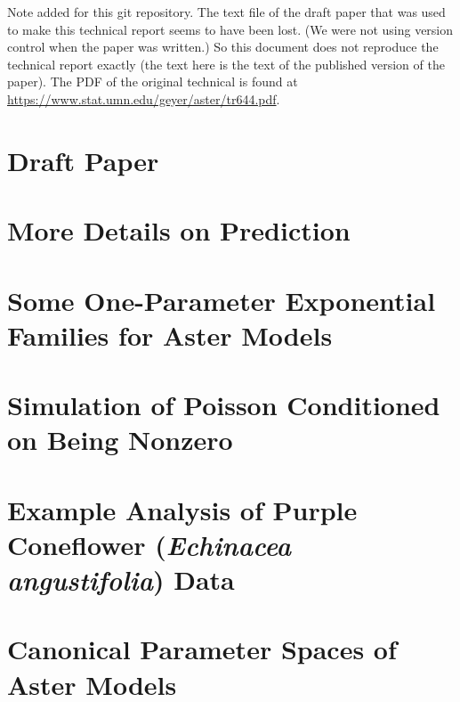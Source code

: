 \documentclass[11pt,twoside,notitlepage]{report}
\begin{document}
Note added for this git repository.  The text file of the draft paper
that was used to make this technical report seems to have been lost.
(We were not using version control when the paper was written.)
So this document does not reproduce the technical report exactly
(the text here is the text of the published version of the paper).
The PDF of the original technical is found
at \url{https://www.stat.umn.edu/geyer/aster/tr644.pdf}.

  \thispagestyle{empty}
  \cleardoublepage
  \setcounter{page}{1}

\chapter{Draft Paper} \label{ch:aster}



\appendix

\chapter{More Details on Prediction} \label{ch:predict}



\chapter{Some One-Parameter Exponential Families for Aster Models}
\label{ch:unit}



\chapter{Simulation of Poisson Conditioned on Being Nonzero} \label{ch:sim}



\chapter{Example Analysis of Purple Coneflower
    (\emph{Echinacea angustifolia}) Data} \label{ch:coneflr}



\chapter{Canonical Parameter Spaces of Aster Models} \label{ch:spaces}


\end{document}
